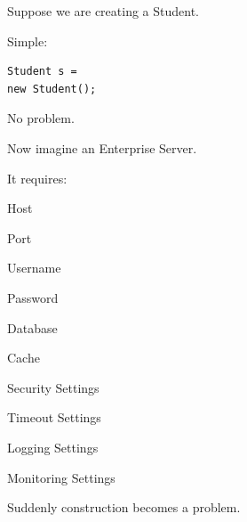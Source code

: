 \documentclass[11pt,a4paper]{book}
\begin{document}
Suppose we are creating a Student.


Simple:

\begin{verbatim}
Student s =
new Student();
\end{verbatim}


No problem.


Now imagine an Enterprise Server.


It requires:


Host


Port


Username


Password


Database


Cache


Security Settings


Timeout Settings


Logging Settings


Monitoring Settings


Suddenly construction becomes
a problem.

\end{document}
